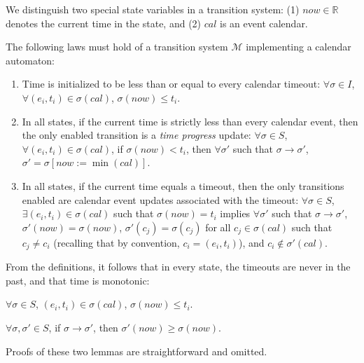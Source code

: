 We distinguish two special state variables in a transition system: (1)
$now \in \mathbb{R}$ denotes the current time in the state, and (2)
$cal$ is an event calendar.

The following laws must hold of a transition system $\mathcal{M}$
implementing a calendar automaton:

\begin{enumerate}

\item \label{cal:a} Time is initialized to be less than or equal to
every calendar timeout: $\forall \sigma \in I$, $\forall (e_i, t_i) \in
\sigma(cal)$, $\sigma(now) \leq t_i$.

\item \label{cal:c} In all states, if the current time is strictly less
than every calendar event, then the only enabled transition is a
\emph{time progress} update: $\forall \sigma \in S$, $\forall (e_i, t_i)
\in \sigma(cal)$, if $\sigma(now) < t_i$, then $\forall \sigma'$ such
that $\sigma \rightarrow \sigma'$, $\sigma' = \sigma[now := \min(cal)]$.

\item \label{cal:d} In all states, if the current time equals a timeout,
then the only transitions enabled are calendar event updates associated
with the timeout: $\forall \sigma \in S$, $\exists (e_i, t_i) \in
\sigma(cal)$ such that $\sigma(now) = t_i$ implies $\forall \sigma'$
such that $\sigma \rightarrow \sigma'$, $\sigma'(now) = \sigma(now)$,
$\sigma'(c_j) = \sigma(c_j)$ for all $c_j \in \sigma(cal)$ such that
$c_j \neq c_i$ (recalling that by convention, $c_i = (e_i, t_i)$), and
$c_i \notin \sigma'(cal)$.

\end{enumerate}

From the definitions, it follows that in every state, the timeouts are
never in the past, and that time is monotonic:

\begin{lemma}\label{lem:ft} $\forall \sigma \in S$,
$(e_i, t_i) \in \sigma(cal)$, $\sigma(now) \leq t_i$.  \end{lemma}

\begin{lemma} $\forall \sigma, \sigma' \in S$, if
$\sigma \rightarrow \sigma'$, then $\sigma'(now) \geq \sigma(now)$.
\end{lemma}

Proofs of these two lemmas are straightforward and omitted.

